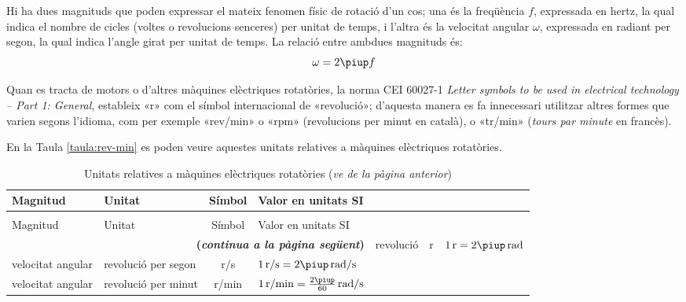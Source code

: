 Hi ha dues magnituds que poden expressar el mateix fenomen físic de rotació d'un cos; una és la freqüència $f$, expressada en hertz, la qual indica el nombre de cicles (voltes o revolucions senceres) per unitat de temps, i l'altra és la velocitat angular $\omega$, expressada en radiant per segon, la qual indica l'angle girat per unitat de temps. La relació entre ambdues magnituds és:
\begin{equation}
  \omega = 2 \piup f
\end{equation}

Quan es tracta de motors o d'altres màquines elèctriques rotatòries, la norma CEI 60027-1 \textit{Letter symbols to be used in electrical technology -- Part 1: General}, estableix «r» com el símbol internacional de «revolució»;  d'aquesta manera es fa innecessari utilitzar altres formes que varien segons l'idioma, com per exemple «rev/min» o «rpm» (revolucions per minut en català), o «tr/min» (\textit{tours par minute} en francès). 

En la Taula \vref{taula:rev-min} es poden veure aquestes unitats relatives a màquines elèctriques rotatòries.

\begin{longtable}[h]{llcl}
   \caption{\label{taula:rev-min} Unitats relatives a màquines elèctriques rotatòries}\\
   \toprule[1pt]
    Magnitud & Unitat &  Símbol & Valor en unitats SI \\
   \midrule
   \endfirsthead
   \caption[]{Unitats relatives a màquines elèctriques rotatòries (\emph{ve de la pàgina anterior})}\\
   \toprule[1pt]
    Magnitud & Unitat &  Símbol & Valor en unitats SI \\
   \midrule
   \endhead
   \midrule
   \multicolumn{4}{r}{\sffamily\bfseries\color{NavyBlue}(\emph{continua a la pàgina següent})}
   \endfoot
   \endlastfoot
   angle pla & revolució &  \unit{r} & $\qty{1}{r} = 2\piup\unit{\,rad}$  \\
   velocitat angular & revolució per segon &  \unit{r/s}& $\qty{1}{r/s} = 2\piup\unit{\,rad/s}$  \\
   velocitat angular & revolució per minut &  \unit{r/min}& $\qty{1}{r/min} = \frac{2\piup}{60}\unit{\,rad/s}$  \\
   \bottomrule[1pt]
\end{longtable}


